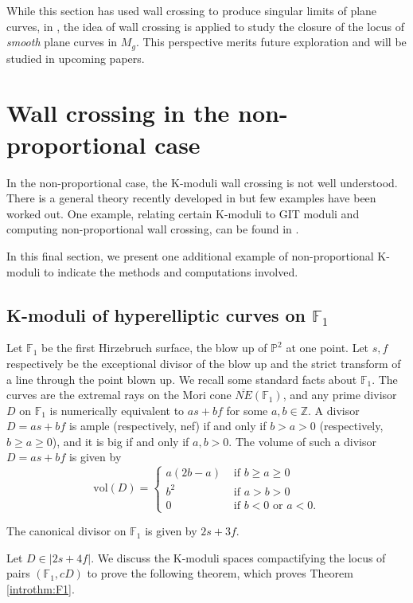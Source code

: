 \documentclass[11pt]{amsart}
\numberwithin{equation}{section}
\theoremstyle{definition}
\newcommand{\bF}{\mathbb{F}}
\newcommand{\bP}{\mathbb{P}}
\newcommand{\bZ}{\mathbb{Z}}
\newcommand{\vol}{\mathrm{vol}}
\begin{document}
While this section has used wall crossing to produce singular limits of plane curves, in \cite{DS}, the idea of wall crossing is applied to study the closure of the locus of \textit{smooth} plane curves in $M_g$.  This perspective merits future exploration and will be studied in upcoming papers.


\section{Wall crossing in the non-proportional case}\label{sec:nonprop}

In the non-proportional case, the K-moduli wall crossing is not well understood. There is a general theory recently developed in \cite{LZreal,LZwalls} but few examples have been worked out.  One example, relating certain K-moduli to GIT moduli and computing non-proportional wall crossing, can be found in \cite{218}.  

In this final section, we present one additional example of non-proportional K-moduli to indicate the methods and computations involved. 

\subsection{K-moduli of hyperelliptic curves on $\bF_1$}

Let $\bF_1$ be the first Hirzebruch surface, the blow up of $\bP^2$ at one point.  Let $s, f$ respectively be the exceptional divisor of the blow up and the strict transform of a line through the point blown up.  We recall some standard facts about $\bF_1$.  The curves are the extremal rays on the Mori cone $\overline{NE}(\bF_1)$, and any prime divisor $D$ on $\bF_1$ is numerically equivalent to $as + b f$ for some $a,b \in \bZ$.  A divisor $D = as + bf$ is ample (respectively, nef) if and only if $b > a > 0$ (respectively, $b \ge a \ge 0$), and it is big if and only if $a, b > 0$.  The volume of such a divisor $D = as + bf$ is given by 
\[  \vol(D) = \left\{ \begin{array}{cc}
    a(2b-a) & \text{ if } b \ge a \ge 0 \\
    b^2 & \text{ if } a > b > 0 \\
    0 & \text{ if } b < 0 \text{ or } a <0 . 
\end{array} \right. \]

The canonical divisor on $\bF_1$ is given by $2s + 3f$.  

Let $D \in | 2s + 4f|$.  We discuss the K-moduli spaces compactifying the locus of pairs $(\bF_1, cD)$ to prove the following theorem, which proves Theorem \ref{introthm:F1}.
\end{document}
